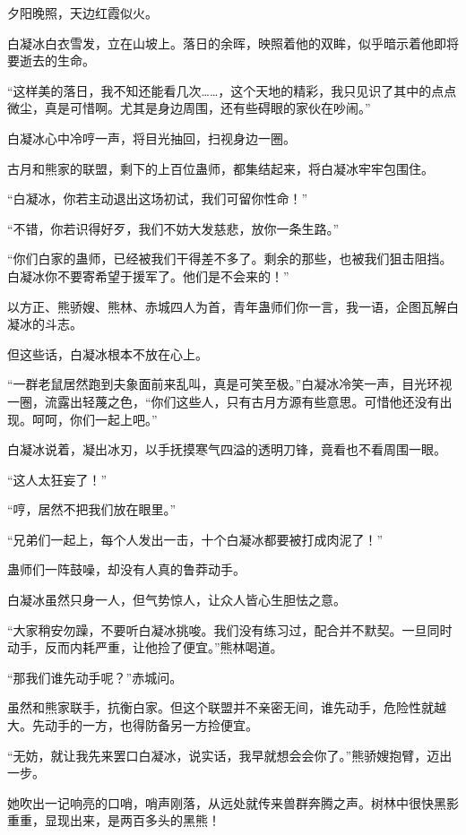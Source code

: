 
\begin{this_body}

夕阳晚照，天边红霞似火。

白凝冰白衣雪发，立在山坡上。落日的余晖，映照着他的双眸，似乎暗示着他即将要逝去的生命。

“这样美的落日，我不知还能看几次……，这个天地的精彩，我只见识了其中的点点微尘，真是可惜啊。尤其是身边周围，还有些碍眼的家伙在吵闹。”

白凝冰心中冷哼一声，将目光抽回，扫视身边一圈。

古月和熊家的联盟，剩下的上百位蛊师，都集结起来，将白凝冰牢牢包围住。

“白凝冰，你若主动退出这场初试，我们可留你性命！”

“不错，你若识得好歹，我们不妨大发慈悲，放你一条生路。”

“你们白家的蛊师，已经被我们干得差不多了。剩余的那些，也被我们狙击阻挡。白凝冰你不要寄希望于援军了。他们是不会来的！”

以方正、熊骄嫂、熊林、赤城四人为首，青年蛊师们你一言，我一语，企图瓦解白凝冰的斗志。

但这些话，白凝冰根本不放在心上。

“一群老鼠居然跑到夫象面前来乱叫，真是可笑至极。”白凝冰冷笑一声，目光环视一圈，流露出轻蔑之色，“你们这些人，只有古月方源有些意思。可惜他还没有出现。呵呵，你们一起上吧。”

白凝冰说着，凝出冰刃，以手抚摸寒气四溢的透明刀锋，竟看也不看周围一眼。

“这人太狂妄了！”

“哼，居然不把我们放在眼里。”

“兄弟们一起上，每个人发出一击，十个白凝冰都要被打成肉泥了！”

蛊师们一阵鼓噪，却没有人真的鲁莽动手。

白凝冰虽然只身一人，但气势惊人，让众人皆心生胆怯之意。

“大家稍安勿躁，不要听白凝冰挑唆。我们没有练习过，配合并不默契。一旦同时动手，反而内耗严重，让他捡了便宜。”熊林喝道。

“那我们谁先动手呢？”赤城问。

虽然和熊家联手，抗衡白家。但这个联盟并不亲密无间，谁先动手，危险性就越大。先动手的一方，也得防备另一方捡便宜。

“无妨，就让我先来罢口白凝冰，说实话，我早就想会会你了。”熊骄嫂抱臂，迈出一步。

她吹出一记响亮的口哨，哨声刚落，从远处就传来兽群奔腾之声。树林中很快黑影重重，显现出来，是两百多头的黑熊！


\end{this_body}
